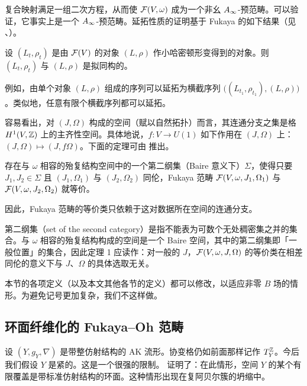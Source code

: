 复合映射满足一组二次方程，从而使 $\mathcal{F}(V,\omega)$ 成为一个非幺 $A_{\infty}$-预范畴。可以验证，它事实上是一个 $A_{\infty}$-预范畴。延拓性质的证明基于 Fukaya 的如下结果（见 \cite{Fu2}、\cite{Se}）。

\begin{prp}
设 $(L_t,\rho_t)$ 是由 $\mathcal{F}(V)$ 的对象 $(L,\rho)$ 作小哈密顿形变得到的对象。则 $(L_t,\rho_t)$ 与 $(L,\rho)$ 是拟同构的。
\end{prp}

例如，由单个对象 $(L,\rho)$ 组成的序列可以延拓为横截序列 $\bigl((L_{t_1},\rho_{t_1}),(L,\rho)\bigr)$。类似地，任意有限个横截序列都可以延拓。

容易看出，对 $(J,\Omega)$ 构成的空间（赋以自然拓扑）而言，其连通分支之集是格 $H^1(V,\mathbb{Z})$ 上的主齐性空间。具体地说，$f:V\to U(1)$ 如下作用在 $(J,\Omega)$ 上：$(J,\Omega)\mapsto(J,f\Omega)$。下面的定理可由 \cite{Fu2} 推出。

\begin{thm}
存在与 $\omega$ 相容的殆复结构空间中的一个第二纲集（Baire 意义下）$\Sigma$，使得只要 $J_1,J_2\in\Sigma$ 且 $(J_1,\Omega_1)$ 与 $(J_2,\Omega_2)$ 同伦，Fukaya 范畴 $\mathcal{F}(V,\omega,J_1,\Omega_1)$ 与 $\mathcal{F}(V,\omega,J_2,\Omega_2)$ 就等价。
\end{thm}

因此，Fukaya 范畴的等价类只依赖于这对数据所在空间的连通分支。

\begin{yizhu}[第二纲集]
第二纲集（set of the second category）是指不能表为可数个无处稠密集之并的集合。与 $\omega$ 相容的殆复结构构成的空间是一个 Baire 空间，其中的第二纲集即「一般位置」的集合，因此定理 1 应读作：对一般的 $J$，$\mathcal{F}(V,\omega,J,\Omega)$ 的等价类在相差同伦的意义下与 $J$、$\Omega$ 的具体选取无关。
\end{yizhu}

\begin{rmk}
本节的各项定义（以及本文其他各节的定义）都可以修改，以适应非零 $B$ 场的情形。为避免记号更加复杂，我们不这样做。
\end{rmk}

\subsection{环面纤维化的 Fukaya--Oh 范畴}

设 $(Y,g_Y,\nabla)$ 是带整仿射结构的 AK 流形。协变格仍如前面那样记作 $T^{\mathbb{Z}}_Y$。今后我们假设 $Y$ 是紧的。这是一个很强的限制。\cite{CY} 证明了：在此情形，空间 $Y$ 的某个有限覆盖是带标准仿射结构的环面。这种情形出现在复阿贝尔簇的坍缩中。

